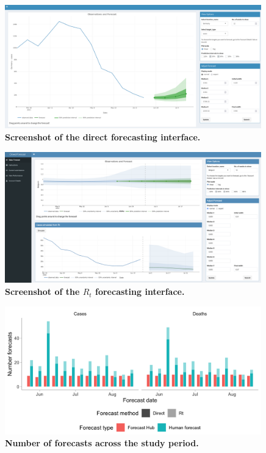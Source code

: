 \documentclass[10pt,a4paper,twocolumn]{article}
\begin{document}
\begin{figure}
\centering
\includegraphics[width=0.99\textwidth]{../output/figures/screenshot-crowd-classical.png}
\caption{\bf{Screenshot of the direct forecasting interface.}}
\label{fig:screenshot-classical}
\end{figure}


\begin{figure}
\centering
\includegraphics[width=0.99\textwidth]{../output/figures/screenshot-crowd-rt-app.png}
\caption{\bf{Screenshot of the $R_t$ forecasting interface.}}
\label{fig:screenshot-rt}
\end{figure}

\begin{figure}
\centering
\includegraphics[width=0.99\textwidth]{../output/figures/num-forecasters.png}
\caption{\bf{Number of forecasts across the study period.}}
\label{fig:num-forecasters}
\end{figure}
\end{document}
